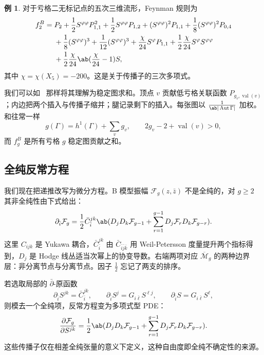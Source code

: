 \documentclass{amsart}
\theoremstyle{definition}
\newtheorem{exm}[thm]{例}
\theoremstyle{remark}
\theoremstyle{plain}
\theoremstyle{definition}
\theoremstyle{remark}
\newcommand{\Mbar}{\overline{\mathcal{M}}}
\newcommand{\mc}[1]{\mathcal{#1}}
\newcommand{\on}[1]{\operatorname{#1}}
\newcommand{\1}{\mathbf{1}}
\newcommand{\2}{\mathbf{2}}
\newcommand{\3}{\mathbf{3}}
\DeclareMathOperator{\Aut}{Aut}
\begin{document}
\begin{exm}
    对于亏格二无标记点的五次三维流形，Feynman 规则为
    \begin{align*}
        f_2^B ={}& P_2 + \frac{1}{2}S^{\varphi\varphi}P_{1,1}^2 + \frac{1}{2}S^{\varphi\varphi}P_{1,2} + (S^{\varphi\varphi})^2 P_{1,1} + \frac{1}{8}(S^{\varphi\varphi})^2 P_{0,4} \\
        &+ \frac{1}{8}(S^{\varphi\varphi})^3 + \frac{1}{12}(S^{\varphi\varphi})^3 + \frac{\chi}{24}S^{\varphi}P_{1,1} + \frac{1}{2}\frac{\chi}{24}S^{\varphi}S^{\varphi\varphi} \\
        &+ \frac{1}{2}\frac{\chi}{24}\ab(\frac{\chi}{24}-1)S,
    \end{align*}
    其中 \(\chi = \chi(X_5) = -200\)。这是关于传播子的三次多项式。
\end{exm}

我们可以如~ 那样将其理解为稳定图求和。顶点 \(v\) 贡献低亏格关联函数 \(P_{g_v, \on{val}(v)}\)；内边把两个插入与传播子缩并；腿记录剩下的插入。每张图以 \(\frac{1}{\ab|\Aut \Gamma|}\) 加权。和往常一样
\[ g(\Gamma) = h^1(\Gamma) + \sum_v g_v, \qquad 2g_v - 2 + \on{val}(v) > 0, \]
而 \(f_g^B\) 是所有亏格 \(g\) 稳定图贡献之和。

\subsection{全纯反常方程}%
\label{sub:The holomorphic anomaly equation}

我们现在把递推改写为微分方程。B 模型振幅 \(\mc{F}_g(z,\bar{z})\) 不是全纯的，对 \(g \geq 2\) 其非全纯性由下式给出：
\[ \partial_{\bar{i}} \mc{F}_g = \frac{1}{2}\bar{C}_{\bar{i}}^{jk}\ab( D_j D_k \mc{F}_{g-1} + \sum_{r=1}^{g-1} D_j \mc{F}_r D_k \mc{F}_{g-r} ). \]
这里 \(C_{ijk}\) 是 Yukawa 耦合，\(\bar{C}_{\bar{i}}^{jk}\) 由 \(\bar{C}_{\bar{i}\bar{j}\bar{k}}\) 用 Weil-Petersson 度量提升两个指标得到，\(D_j\) 是 Hodge 线丛适当次幂上的协变导数。右端两项对应 \(\Mbar_g\) 的两种边界层：非分离节点与分离节点。因子 \(\frac{1}{2}\) 忘记了两支的排序。

若选取局部的 \(\bar{\partial}\)-原函数
\[ \partial_{\bar{i}}S^{jk} = \bar{C}_{\bar{i}}^{jk}, \qquad \partial_{\bar{i}}S^j = G_{i\bar{\ell}}S^{\ell j}, \qquad \partial_{\bar{i}}S = G_{i\bar{\ell}}S^{\ell}, \]
则模去一个全纯项，反常方程变为多项式型 PDE：
\[ \pdv{\mc{F}_g}{S^{jk}} = \frac{1}{2}\ab( D_jD_k \mc{F}_{g-1} + \sum_{r=1}^{g-1} D_j \mc{F}_r D_k \mc{F}_{g-r} ). \]
这些传播子仅在相差全纯张量的意义下定义，这种自由度即全纯不确定性的来源。
\end{document}
